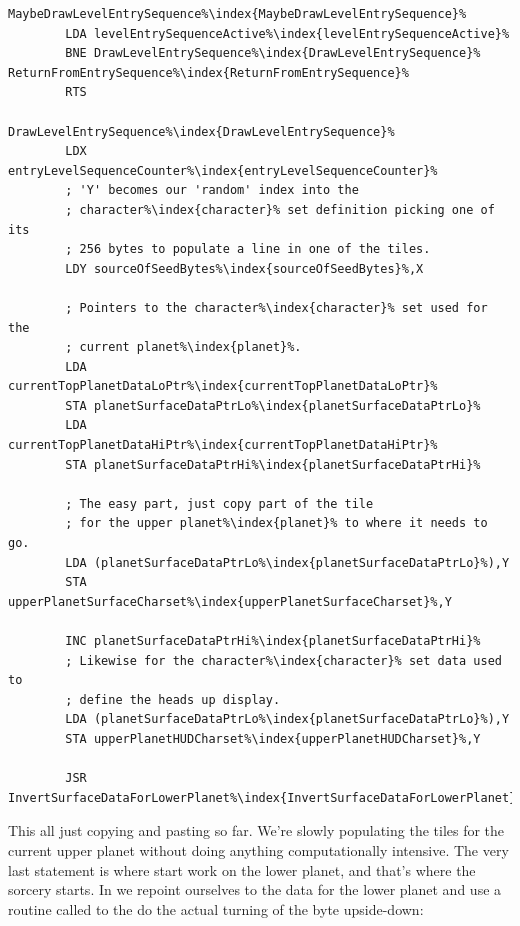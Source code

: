 \begin{lstlisting}[escapechar=\%,caption=The start of \icode{MaybeDrawLevelEntrySequence\index{MaybeDrawLevelEntrySequence}}. As long as \icode{levelEntrySequenceActive\index{levelEntrySequenceActive}}
is non-zero\, \icode{DrawLevelEntrySequence\index{DrawLevelEntrySequence}} will run.]
MaybeDrawLevelEntrySequence%\index{MaybeDrawLevelEntrySequence}%
        LDA levelEntrySequenceActive%\index{levelEntrySequenceActive}%
        BNE DrawLevelEntrySequence%\index{DrawLevelEntrySequence}%
ReturnFromEntrySequence%\index{ReturnFromEntrySequence}%   
        RTS

DrawLevelEntrySequence%\index{DrawLevelEntrySequence}%   
        LDX entryLevelSequenceCounter%\index{entryLevelSequenceCounter}%
        ; 'Y' becomes our 'random' index into the
        ; character%\index{character}% set definition picking one of its
        ; 256 bytes to populate a line in one of the tiles.
        LDY sourceOfSeedBytes%\index{sourceOfSeedBytes}%,X

        ; Pointers to the character%\index{character}% set used for the
        ; current planet%\index{planet}%.
        LDA currentTopPlanetDataLoPtr%\index{currentTopPlanetDataLoPtr}%
        STA planetSurfaceDataPtrLo%\index{planetSurfaceDataPtrLo}%
        LDA currentTopPlanetDataHiPtr%\index{currentTopPlanetDataHiPtr}%
        STA planetSurfaceDataPtrHi%\index{planetSurfaceDataPtrHi}%

        ; The easy part, just copy part of the tile
        ; for the upper planet%\index{planet}% to where it needs to go.
        LDA (planetSurfaceDataPtrLo%\index{planetSurfaceDataPtrLo}%),Y
        STA upperPlanetSurfaceCharset%\index{upperPlanetSurfaceCharset}%,Y

        INC planetSurfaceDataPtrHi%\index{planetSurfaceDataPtrHi}%
        ; Likewise for the character%\index{character}% set data used to 
        ; define the heads up display.
        LDA (planetSurfaceDataPtrLo%\index{planetSurfaceDataPtrLo}%),Y
        STA upperPlanetHUDCharset%\index{upperPlanetHUDCharset}%,Y

        JSR InvertSurfaceDataForLowerPlanet%\index{InvertSurfaceDataForLowerPlanet}%
\end{lstlisting}


This all just copying and pasting so far. We're slowly populating the tiles for the current upper planet without doing
anything computationally intensive. The very last statement is where start work on the lower planet, and that's where
the sorcery starts. In  we repoint ourselves to the data for the lower planet
and use a routine called  to the do the actual turning of the byte upside-down:

